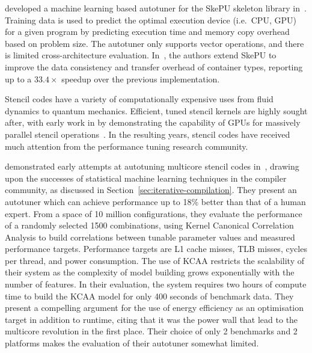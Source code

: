 \citeauthor{Dastgeer2011} developed a machine learning based autotuner
for the SkePU skeleton library in~\cite{Dastgeer2011}. Training data
is used to predict the optimal execution device (i.e.\ CPU, GPU) for a
given program by predicting execution time and memory copy overhead
based on problem size. The autotuner only supports vector operations,
and there is limited cross-architecture
evaluation. In~\cite{Dastgeer2015a}, the authors extend SkePU to
improve the data consistency and transfer overhead of container types,
reporting up to a $33.4\times$ speedup over the previous
implementation.



Stencil codes have a variety of computationally expensive uses from
fluid dynamics to quantum mechanics. Efficient, tuned stencil kernels
are highly sought after, with early work in \citeyear{Bolz2003} by
\citeauthor{Bolz2003} demonstrating the capability of GPUs for
massively parallel stencil operations~\cite{Bolz2003}. In the
resulting years, stencil codes have received much attention from the
performance tuning research community.

\citeauthor{Ganapathi2009} demonstrated early attempts at autotuning
multicore stencil codes in~\cite{Ganapathi2009}, drawing upon the
successes of statistical machine learning techniques in the compiler
community, as discussed in
Section~\ref{sec:iterative-compilation}. They present an autotuner
which can achieve performance up to 18\% better than that of a human
expert. From a space of 10 million configurations, they evaluate the
performance of a randomly selected 1500 combinations, using Kernel
Canonical Correlation Analysis to build correlations between tunable
parameter values and measured performance targets. Performance targets
are L1 cache misses, TLB misses, cycles per thread, and power
consumption. The use of KCAA restricts the scalability of their system
as the complexity of model building grows exponentially with the
number of features. In their evaluation, the system requires two hours
of compute time to build the KCAA model for only 400 seconds of
benchmark data. They present a compelling argument for the use of
energy efficiency as an optimisation target in addition to runtime,
citing that it was the power wall that lead to the multicore
revolution in the first place. Their choice of only 2 benchmarks and 2
platforms makes the evaluation of their autotuner somewhat limited.

